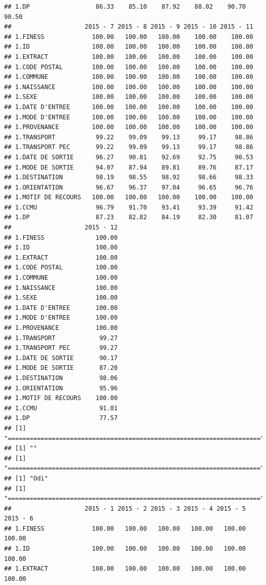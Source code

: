 \documentclass[]{article}
\begin{document}
\begin{verbatim}
## 1.DP                  86.33    85.10    87.92    88.02    90.70    90.50
##                    2015 - 7 2015 - 8 2015 - 9 2015 - 10 2015 - 11
## 1.FINESS             100.00   100.00   100.00    100.00    100.00
## 1.ID                 100.00   100.00   100.00    100.00    100.00
## 1.EXTRACT            100.00   100.00   100.00    100.00    100.00
## 1.CODE POSTAL        100.00   100.00   100.00    100.00    100.00
## 1.COMMUNE            100.00   100.00   100.00    100.00    100.00
## 1.NAISSANCE          100.00   100.00   100.00    100.00    100.00
## 1.SEXE               100.00   100.00   100.00    100.00    100.00
## 1.DATE D'ENTREE      100.00   100.00   100.00    100.00    100.00
## 1.MODE D'ENTREE      100.00   100.00   100.00    100.00    100.00
## 1.PROVENANCE         100.00   100.00   100.00    100.00    100.00
## 1.TRANSPORT           99.22    99.09    99.13     99.17     98.86
## 1.TRANSPORT PEC       99.22    99.09    99.13     99.17     98.86
## 1.DATE DE SORTIE      96.27    90.81    92.69     92.75     90.53
## 1.MODE DE SORTIE      94.07    87.94    89.81     89.76     87.17
## 1.DESTINATION         98.19    98.55    98.92     98.66     98.33
## 1.ORIENTATION         96.67    96.37    97.04     96.65     96.76
## 1.MOTIF DE RECOURS   100.00   100.00   100.00    100.00    100.00
## 1.CCMU                96.79    91.70    93.41     93.39     91.42
## 1.DP                  87.23    82.82    84.19     82.30     81.07
##                    2015 - 12
## 1.FINESS              100.00
## 1.ID                  100.00
## 1.EXTRACT             100.00
## 1.CODE POSTAL         100.00
## 1.COMMUNE             100.00
## 1.NAISSANCE           100.00
## 1.SEXE                100.00
## 1.DATE D'ENTREE       100.00
## 1.MODE D'ENTREE       100.00
## 1.PROVENANCE          100.00
## 1.TRANSPORT            99.27
## 1.TRANSPORT PEC        99.27
## 1.DATE DE SORTIE       90.17
## 1.MODE DE SORTIE       87.20
## 1.DESTINATION          98.06
## 1.ORIENTATION          95.96
## 1.MOTIF DE RECOURS    100.00
## 1.CCMU                 91.01
## 1.DP                   77.57
## [1] "====================================================================="
## [1] ""
## [1] "====================================================================="
## [1] "Odi"
## [1] "====================================================================="
##                    2015 - 1 2015 - 2 2015 - 3 2015 - 4 2015 - 5 2015 - 6
## 1.FINESS             100.00   100.00   100.00   100.00   100.00   100.00
## 1.ID                 100.00   100.00   100.00   100.00   100.00   100.00
## 1.EXTRACT            100.00   100.00   100.00   100.00   100.00   100.00

\end{verbatim}
\end{document}
